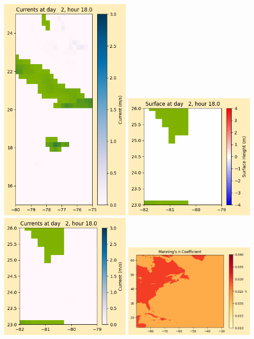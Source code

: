 \documentclass[11pt]{article}
\begin{document}
\includegraphics[width=0.475\textwidth]{frame0023fig1008.png}
\vskip 10pt 
\includegraphics[width=0.475\textwidth]{frame0023fig1009.png}
\includegraphics[width=0.475\textwidth]{frame0023fig1010.png}
\vskip 10pt 
\includegraphics[width=0.475\textwidth]{frame0023fig1011.png}
\end{document}
